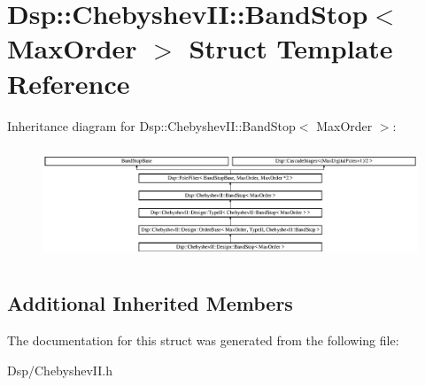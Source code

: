 \hypertarget{structDsp_1_1ChebyshevII_1_1BandStop}{\section{Dsp\-:\-:Chebyshev\-I\-I\-:\-:Band\-Stop$<$ Max\-Order $>$ Struct Template Reference}
\label{structDsp_1_1ChebyshevII_1_1BandStop}
}
Inheritance diagram for Dsp\-:\-:Chebyshev\-I\-I\-:\-:Band\-Stop$<$ Max\-Order $>$\-:\begin{figure}[H]
\begin{center}
\leavevmode
\includegraphics[height=3.393939cm]{structDsp_1_1ChebyshevII_1_1BandStop}
\end{center}
\end{figure}
\subsection*{Additional Inherited Members}


The documentation for this struct was generated from the following file\-:\begin{DoxyCompactItemize}
\item 
Dsp/Chebyshev\-I\-I.\-h\end{DoxyCompactItemize}
